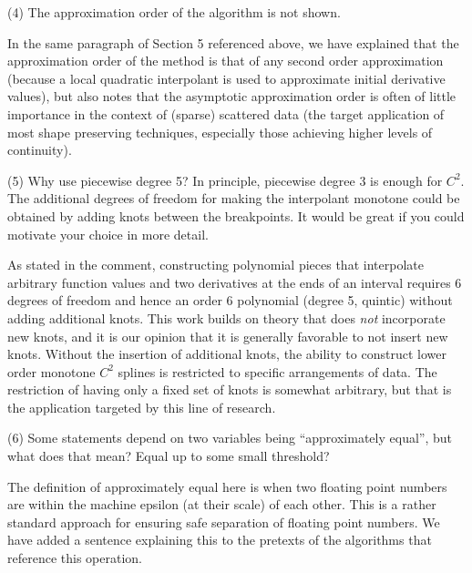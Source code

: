 \goodbreak
{\parindent=20pt \it

\item{(4)} The approximation order of the algorithm is not shown.

}

In the same paragraph of Section 5 referenced above, we have explained
that the approximation order of the method is that of any second order
approximation (because a local quadratic interpolant is used to
approximate initial derivative values), but also notes that the
asymptotic approximation order is often of little importance in the
context of (sparse) scattered data (the target application of most
shape preserving techniques, especially those achieving higher levels
of continuity).


\goodbreak
{\parindent=20pt \it

\item{(5)} Why use piecewise degree 5? In principle, piecewise degree 3
  is enough for $C^2$. The additional degrees of freedom for making
  the interpolant monotone could be obtained by adding knots between
  the breakpoints. It would be great if you could motivate your choice
  in more detail.

}

As stated in the comment, constructing polynomial pieces that
interpolate arbitrary function values and two derivatives at the ends
of an interval requires 6 degrees of freedom and hence an order 6
polynomial (degree 5, quintic) without adding additional knots. This
work builds on theory that does {\it not} incorporate new knots, and
it is our opinion that it is generally favorable to not insert new
knots. Without the insertion of additional knots, the ability to
construct lower order monotone $C^2$ splines is restricted to specific
arrangements of data. The restriction of having only a fixed set of
knots is somewhat arbitrary, but that is the application targeted by
this line of research.


\goodbreak
{\parindent=20pt \it

\item{(6)} Some statements depend on two variables being
  ``approximately equal'', but what does that mean? Equal up to some
  small threshold?

}

The definition of approximately equal here is when two floating point
numbers are within the machine epsilon (at their scale) of each other.
This is a rather standard approach for ensuring safe separation of
floating point numbers. We have added a sentence explaining this to
the pretexts of the algorithms that reference this operation.


